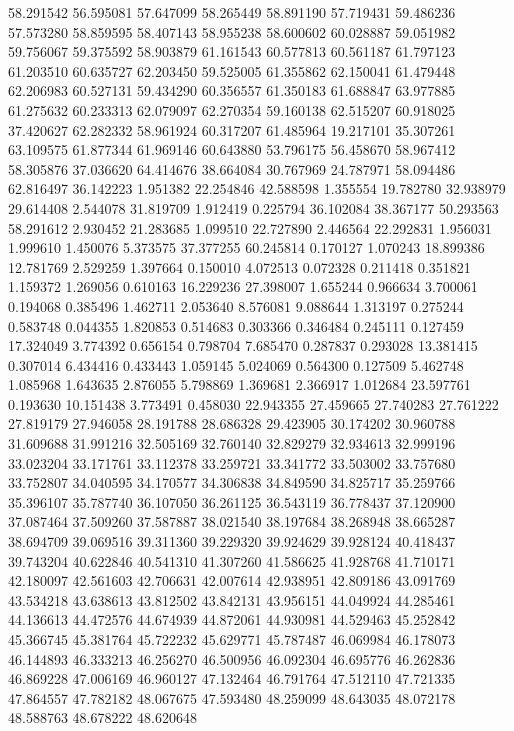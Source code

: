 58.291542
56.595081
57.647099
58.265449
58.891190
57.719431
59.486236
57.573280
58.859595
58.407143
58.955238
58.600602
60.028887
59.051982
59.756067
59.375592
58.903879
61.161543
60.577813
60.561187
61.797123
61.203510
60.635727
62.203450
59.525005
61.355862
62.150041
61.479448
62.206983
60.527131
59.434290
60.356557
61.350183
61.688847
63.977885
61.275632
60.233313
62.079097
62.270354
59.160138
62.515207
60.918025
37.420627
62.282332
58.961924
60.317207
61.485964
19.217101
35.307261
63.109575
61.877344
61.969146
60.643880
53.796175
56.458670
58.967412
58.305876
37.036620
64.414676
38.664084
30.767969
24.787971
58.094486
62.816497
36.142223
1.951382
22.254846
42.588598
1.355554
19.782780
32.938979
29.614408
2.544078
31.819709
1.912419
0.225794
36.102084
38.367177
50.293563
58.291612
2.930452
21.283685
1.099510
22.727890
2.446564
22.292831
1.956031
1.999610
1.450076
5.373575
37.377255
60.245814
0.170127
1.070243
18.899386
12.781769
2.529259
1.397664
0.150010
4.072513
0.072328
0.211418
0.351821
1.159372
1.269056
0.610163
16.229236
27.398007
1.655244
0.966634
3.700061
0.194068
0.385496
1.462711
2.053640
8.576081
9.088644
1.313197
0.275244
0.583748
0.044355
1.820853
0.514683
0.303366
0.346484
0.245111
0.127459
17.324049
3.774392
0.656154
0.798704
7.685470
0.287837
0.293028
13.381415
0.307014
6.434416
0.433443
1.059145
5.024069
0.564300
0.127509
5.462748
1.085968
1.643635
2.876055
5.798869
1.369681
2.366917
1.012684
23.597761
0.193630
10.151438
3.773491
0.458030
22.943355
27.459665
27.740283
27.761222
27.819179
27.946058
28.191788
28.686328
29.423905
30.174202
30.960788
31.609688
31.991216
32.505169
32.760140
32.829279
32.934613
32.999196
33.023204
33.171761
33.112378
33.259721
33.341772
33.503002
33.757680
33.752807
34.040595
34.170577
34.306838
34.849590
34.825717
35.259766
35.396107
35.787740
36.107050
36.261125
36.543119
36.778437
37.120900
37.087464
37.509260
37.587887
38.021540
38.197684
38.268948
38.665287
38.694709
39.069516
39.311360
39.229320
39.924629
39.928124
40.418437
39.743204
40.622846
40.541310
41.307260
41.586625
41.928768
41.710171
42.180097
42.561603
42.706631
42.007614
42.938951
42.809186
43.091769
43.534218
43.638613
43.812502
43.842131
43.956151
44.049924
44.285461
44.136613
44.472576
44.674939
44.872061
44.930981
44.529463
45.252842
45.366745
45.381764
45.722232
45.629771
45.787487
46.069984
46.178073
46.144893
46.333213
46.256270
46.500956
46.092304
46.695776
46.262836
46.869228
47.006169
46.960127
47.132464
46.791764
47.512110
47.721335
47.864557
47.782182
48.067675
47.593480
48.259099
48.643035
48.072178
48.588763
48.678222
48.620648
